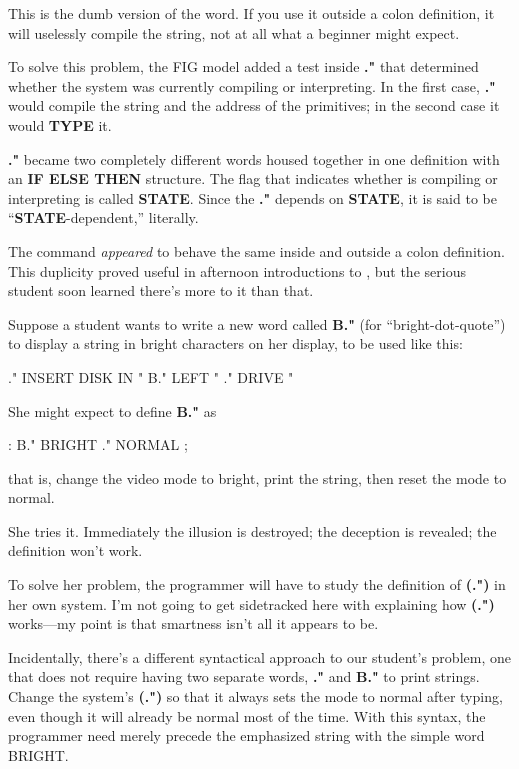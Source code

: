 This is the dumb version of the word. If you use it outside a colon
definition, it will uselessly compile the string, not at all what a beginner
might expect.

To solve this problem, the FIG model added a test inside \textbf{."} that
determined whether the system was currently compiling or interpreting.
In the first case, \textbf{."} would compile the string and the address of the
primitives; in the second case it would \textbf{TYPE} it.

\textbf{."} became two completely different words housed together in one
definition with an \textbf{IF ELSE THEN} structure. The flag that indicates
whether \Forth{} is compiling or interpreting is called \textbf{STATE}. Since the
\textbf{."} depends on \textbf{STATE}, it is said to be ``\textbf{STATE}-dependent,''
literally.

The command \emph{appeared} to behave the same inside and outside a
colon definition. This duplicity proved useful in afternoon introductions
to \Forth{}, but the serious student soon learned there's more to it than
that.

Suppose a student wants to write a new word called \textbf{B."} (for
``bright-dot-quote'') to display a string in bright characters on her
display, to be used like this:

\begin{Code}
." INSERT DISK IN "  B." LEFT "  ." DRIVE "
\end{Code}
She might expect to define \textbf{B."} as

\begin{Code}
: B."   BRIGHT  ."  NORMAL ;
\end{Code}
that is, change the video mode to bright, print the string, then reset the
mode to normal.

She tries it. Immediately the illusion is destroyed; the deception is
revealed; the definition won't work.

To solve her problem, the programmer will have to study the definition
of \textbf{(.")} in her own system. I'm not going to get sidetracked here with
explaining how \textbf{(.")} works---my point is that smartness isn't all it
appears to be.

Incidentally, there's a different syntactical approach to our
student's problem, one that does not require having two separate words,
\textbf{."} and \textbf{B."} to print strings. Change the system's \textbf{(.")} so
that it always sets the mode to normal after typing, even though it will
already be normal most of the time. With this syntax, the programmer
need merely precede the emphasized string with the simple word BRIGHT.

